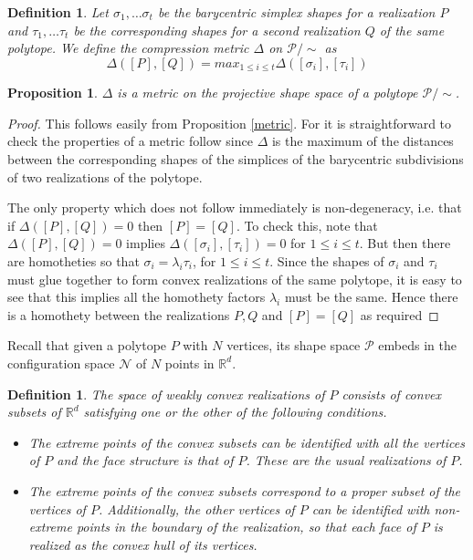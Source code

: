\documentclass[a4paper, 12pt]{amsart}
\theoremstyle{plain}
\newtheorem{Prop}[Thm]{Proposition}
\newtheorem{Def}[Thm]{Definition}
\begin{document}
\begin{Def}
Let $\sigma_1, \dots \sigma_t$ be the barycentric simplex shapes for a realization $P$ and $\tau_1, \dots \tau_t$ be the corresponding shapes for a second realization $Q$ of the same polytope. We define the compression metric $\Delta$ on $\mathcal{P}/\sim$ as $$\Delta([P],[Q])=max_{1 \le i \le t}\Delta([\sigma_i],[\tau_i])$$

\end{Def}


\begin{Prop} \label{metricpoly}
$\Delta$ is a metric on the projective shape space of a polytope $\mathcal{P}/\sim$.

\end{Prop}

\begin{proof}
This follows easily from Proposition \ref{metric}. For it is straightforward to check the properties of a metric follow since $\Delta$ is the maximum of the distances between the corresponding shapes of the simplices of the barycentric subdivisions of two realizations of the polytope. 

The only property which does not follow immediately is non-degeneracy, i.e. that if $\Delta([P],[Q])=0$ then $[P]=[Q]$. To check this, note that 
$\Delta([P],[Q])=0$ implies $\Delta([\sigma_i],[\tau_i])=0$ for $1 \le i \le t$. But then there are homotheties so that $\sigma_i=\lambda_i \tau_i$, for $1 \le i \le t$. Since the shapes of $\sigma_i$ and $\tau_i$ must glue together to form convex realizations of the same polytope, it is easy to see that this implies all the homothety factors $\lambda_i$ must be the same. Hence there is a homothety between the realizations $P,Q$ and $[P]=[Q]$ as required 

\end{proof}

Recall that given a polytope $P$ with $N$ vertices, its shape space $\mathcal P$ embeds in the configuration space $\mathcal N$ of $N$ points in $\mathbb{R}^d$. 


\begin{Def}\label{weak}
The space of weakly convex realizations of $P$ consists of convex subsets of $\mathbb{R}^d$ satisfying one or the other of the following conditions.

\begin{itemize}
 \item The extreme points of the convex subsets can be identified with all the vertices of $P$ and the face structure is that of $P$. These are the usual realizations of $P$.
 
 \item The extreme points of the convex subsets correspond to a proper subset of the vertices of $P$. Additionally, the other vertices of $P$ can be identified with non-extreme points in the boundary of the realization, so that each face of $P$ is realized as the convex hull of its vertices. 
\end{itemize}
\end{Def}
\end{document}
